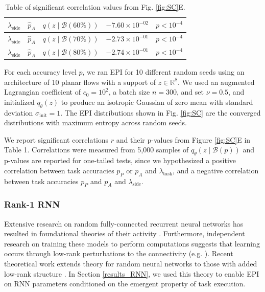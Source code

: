 \documentclass[11pt]{article}
\begin{document}
\begin{table}[h]
\begin{tabular}{l|l|l|l|l}
$\lambda_{\text{side}}$ & $\hat{p}_A$ & $q(z \mid \mathcal{B}(60\%))$ & $-7.60 \times 10^{-02}$ & $p<10^{-4}$  \\ \hline
$\lambda_{\text{side}}$ & $\hat{p}_A$ & $q(z \mid \mathcal{B}(70\%))$ & $-2.73 \times 10^{-01}$ & $p<10^{-4}$  \\ \hline
$\lambda_{\text{side}}$ & $\hat{p}_A$ & $q(z \mid \mathcal{B}(80\%))$ & $-2.74 \times 10^{-01}$ & $p<10^{-4}$  \\ \hline
\end{tabular}
\caption{\small Table of significant correlation values from Fig. \ref{fig:SC}E.}
\end{table}

For each accuracy level $p$, we ran EPI for 10 different random seeds  using an architecture of 10 planar flows with a  support of $z \in \mathbb{R}^8$.   
We used an augmented Lagrangian coefficient of $c_0 = 10^2$, a batch size $n=300$, and set $\nu = 0.5$, and initialized $q_\theta(z)$ to produce an isotropic Gaussian of zero mean with standard deviation $\sigma_{\text{init}} = 1$.
The EPI distributions shown in Fig. \ref{fig:SC} are the converged distributions with maximum entropy across random seeds.

We report significant correlations $r$ and their p-values from Figure \ref{fig:SC}E in Table 1.  Correlations were measured from 5,000 samples of $q_\theta(z \mid \mathcal{B}(p))$ and p-values are reported for one-tailed tests, since we hypothesized a positive correlation between task accuracies $p_P$ or $p_A$ and $\lambda_{\text{task}}$, and a negative correlation between task accuracies $p_P$ and $p_A$ and $\lambda_{\text{side}}$.

\subsubsection{Rank-1 RNN}\label{methods_LRRNN}
Extensive research on random fully-connected recurrent neural networks has resulted in foundational theories of their activity \cite{sompolinsky1988chaos, brunel2000dynamics}.
Furthermore, independent research on training these models to perform computations suggests that learning occurs through low-rank perturbations to the connectivity (e.g. \cite{jaeger2004harnessing, sussillo2009generating}).
Recent theoretical work extends theory for random neural networks \cite{sompolinsky1988chaos} to those with added low-rank structure \cite{mastrogiuseppe2018linking}.
In Section \ref{results_RNN}, we used this theory to enable EPI on RNN parameters conditioned on the emergent property of task execution.
\end{document}
